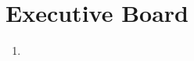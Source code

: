 \chapter{Executive Board}
\label{art:exec}

\begin{enumerate}[label=\Alph*.]
\item 
\end{enumerate}
